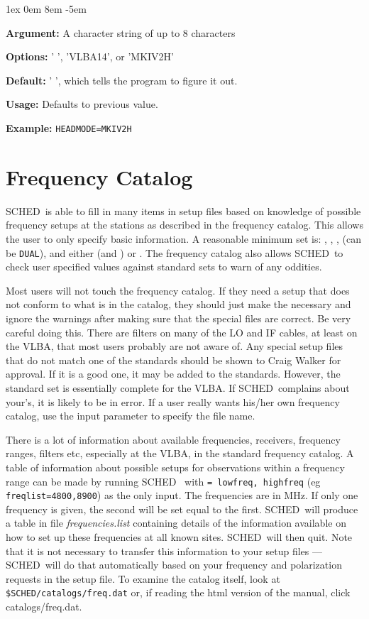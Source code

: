 \documentclass{report}
\newcommand{\schedb}{{\sc SCHED~}}
\newcommand{\rcwbox}[5]{
  \begin{list}{}{\parsep 1ex  \itemsep 0em
                 \leftmargin 8em  \itemindent -5em }
    \item {\bf Argument:} #1
    \item {\bf Options:}  #2
    \item {\bf Default:}  #3
    \item {\bf Usage:}    #4
    \item {\bf Example:}  #5
  \end{list}
}
\begin{document}
\rcwbox
{A character string of up to 8 characters}
{' ', 'VLBA14', or 'MKIV2H'}
{' ', which tells the program to figure it out.}
{Defaults to previous value.}
{{\tt HEADMODE=MKIV2H}}

\section{\label{SEC:FRQCAT}Frequency Catalog}

\schedb is able to fill in many items in setup files based on
knowledge of possible frequency setups at the stations as described in
the frequency catalog.  This allows the user to only specify basic
information.  A reasonable minimum set is: , ,
,  (can be
{\tt DUAL}), and either  (and
) or .
The frequency catalog also allows \schedb to check user specified
values against standard sets to warn of any oddities.

Most users will not touch the frequency catalog.  If they need a setup
that does not conform to what is in the catalog, they should just make
the necessary  and ignore the
warnings after making sure that the special files are correct.  Be
very careful doing this.  There are filters on many of the LO and IF
cables, at least on the VLBA, that most users probably are not aware
of.  Any special setup files that do not match one of the standards
should be shown to Craig Walker for approval.  If it is a good one, it
may be added to the standards.  However, the standard set is
essentially complete for the VLBA.  If \schedb complains about your's,
it is likely to be in error.  If a user really wants his/her own
frequency catalog, use the input parameter
 to specify the file name.

There is a lot of information about available frequencies, receivers,
frequency ranges, filters etc, especially at the VLBA, in the standard
frequency catalog.  A table of information about possible setups for
observations within a frequency range can be made by running \schedb
with  {\tt = lowfreq, highfreq}
(eg {\tt freqlist=4800,8900}) as the only input.  The frequencies are
in MHz.  If only one frequency is given, the second will be set equal
to the first.  \schedb will produce a table in file {\sl
frequencies.list} containing details of the information available on
how to set up these frequencies at all known sites.  \schedb will then
quit.  Note that it is not necessary to transfer this information to
your setup files --- \schedb will do that automatically based on your
frequency and polarization requests in the setup file.  To examine the
catalog itself, look at {\tt \$SCHED/catalogs/freq.dat} or, if reading
the html version of the manual, click 
{catalogs/freq.dat}.
\end{document}
